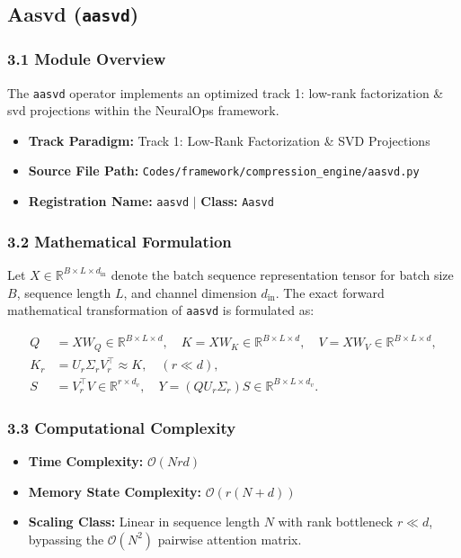 \subsection{Aasvd (\texttt{aasvd})}
\label{sec:app_module_aasvd}

\subsubsection*{3.1 Module Overview}
The \texttt{aasvd} operator implements an optimized track 1: low-rank factorization \& svd projections within the NeuralOps framework.
\begin{itemize}
    \item \textbf{Track Paradigm:} Track 1: Low-Rank Factorization & SVD Projections
    \item \textbf{Source File Path:} \texttt{Codes/framework/compression\_engine/aasvd.py}
    \item \textbf{Registration Name:} \texttt{aasvd} $\mid$ \textbf{Class:} \texttt{Aasvd}
\end{itemize}

\subsubsection*{3.2 Mathematical Formulation}
Let $X \in \mathbb{R}^{B \times L \times d_{\text{in}}}$ denote the batch sequence representation tensor for batch size $B$, sequence length $L$, and channel dimension $d_{\text{in}}$. The exact forward mathematical transformation of \texttt{aasvd} is formulated as:

\begin{align}
Q &= X W_Q \in \mathbb{R}^{B \times L \times d}, \quad K = X W_K \in \mathbb{R}^{B \times L \times d}, \quad V = X W_V \in \mathbb{R}^{B \times L \times d}, \\
K_r &= U_r \Sigma_r V_r^\top \approx K, \quad (r \ll d), \\
S &= V_r^\top V \in \mathbb{R}^{r \times d_v}, \quad Y = (Q U_r \Sigma_r) S \in \mathbb{R}^{B \times L \times d_v}.
\end{align}


\subsubsection*{3.3 Computational Complexity}
\begin{itemize}
    \item \textbf{Time Complexity:} $\mathcal{O}(N r d)$
    \item \textbf{Memory State Complexity:} $\mathcal{O}(r(N + d))$
    \item \textbf{Scaling Class:} Linear in sequence length $N$ with rank bottleneck $r \ll d$, bypassing the $\mathcal{O}(N^2)$ pairwise attention matrix.
\end{itemize}

